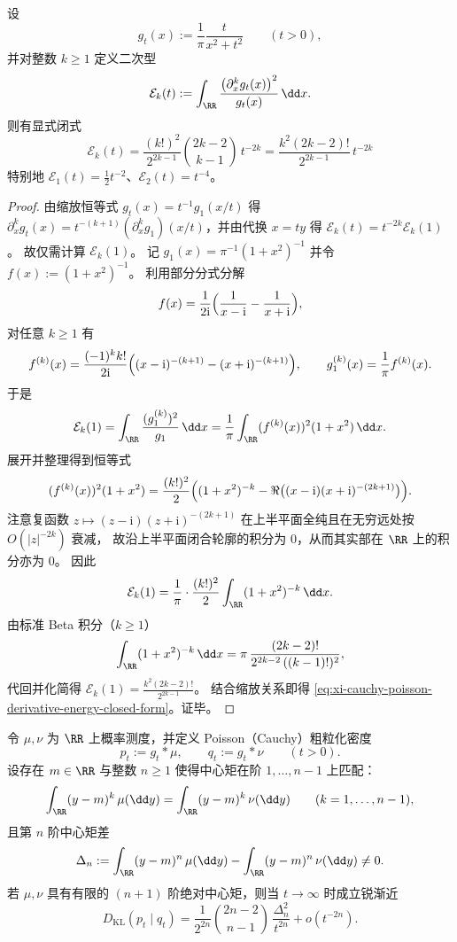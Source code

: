 \begin{proposition}\label{prop:xi-cauchy-poisson-derivative-energy-closed-form}
设
\[
g_t(x):=\frac{1}{\pi}\frac{t}{x^2+t^2}\qquad(t>0),
\]
并对整数 \(k\ge 1\) 定义二次型
\[
\mathcal{E}_k(t):=\int_{\RR}\frac{\bigl(\partial_x^{k}g_t(x)\bigr)^2}{g_t(x)}\,\dd x.
\]
则有显式闭式
\begin{equation}\label{eq:xi-cauchy-poisson-derivative-energy-closed-form}
\boxed{\;
\mathcal{E}_k(t)=\frac{(k!)^2}{2^{2k-1}}\binom{2k-2}{k-1}\,t^{-2k}
=\frac{k^2(2k-2)!}{2^{2k-1}}\,t^{-2k}\;}
\end{equation}
特别地 \(\mathcal{E}_1(t)=\tfrac12 t^{-2}\)、\(\mathcal{E}_2(t)=t^{-4}\)。
\end{proposition}

\begin{proof}
由缩放恒等式 \(g_t(x)=t^{-1}g_1(x/t)\) 得
\(
\partial_x^k g_t(x)=t^{-(k+1)}(\partial_x^k g_1)(x/t)
\)，并由代换 \(x=ty\) 得
\(
\mathcal{E}_k(t)=t^{-2k}\mathcal{E}_k(1)
\)。
故仅需计算 \(\mathcal{E}_k(1)\)。
记 \(g_1(x)=\pi^{-1}(1+x^2)^{-1}\) 并令 \(f(x):=(1+x^2)^{-1}\)。
利用部分分式分解
\[
f(x)=\frac{1}{2\mathrm{i}}\Bigl(\frac{1}{x-\mathrm{i}}-\frac{1}{x+\mathrm{i}}\Bigr),
\]
对任意 \(k\ge 1\) 有
\[
f^{(k)}(x)=\frac{(-1)^k k!}{2\mathrm{i}}\Bigl((x-\mathrm{i})^{-(k+1)}-(x+\mathrm{i})^{-(k+1)}\Bigr),
\qquad
g_1^{(k)}(x)=\frac{1}{\pi}f^{(k)}(x).
\]
于是
\[
\mathcal{E}_k(1)
=\int_{\RR}\frac{(g_1^{(k)})^2}{g_1}\,\dd x
=\frac{1}{\pi}\int_{\RR}(f^{(k)}(x))^2(1+x^2)\,\dd x.
\]
展开并整理得到恒等式
\[
(f^{(k)}(x))^2(1+x^2)
=\frac{(k!)^2}{2}\Bigl((1+x^2)^{-k}-\Re\bigl((x-\mathrm{i})(x+\mathrm{i})^{-(2k+1)}\bigr)\Bigr).
\]
注意复函数 \(z\mapsto (z-\mathrm{i})(z+\mathrm{i})^{-(2k+1)}\) 在上半平面全纯且在无穷远处按 \(O(|z|^{-2k})\) 衰减，
故沿上半平面闭合轮廓的积分为 \(0\)，从而其实部在 \(\RR\) 上的积分亦为 \(0\)。
因此
\[
\mathcal{E}_k(1)=\frac{1}{\pi}\cdot\frac{(k!)^2}{2}\int_{\RR}(1+x^2)^{-k}\,\dd x.
\]
由标准 Beta 积分（\(k\ge 1\)）
\[
\int_{\RR}(1+x^2)^{-k}\,\dd x
=\pi\,\frac{(2k-2)!}{2^{2k-2}\,((k-1)!)^2},
\]
代回并化简得
\(
\mathcal{E}_k(1)=\frac{k^2(2k-2)!}{2^{2k-1}}
\)。
结合缩放关系即得 \eqref{eq:xi-cauchy-poisson-derivative-energy-closed-form}。证毕。
\end{proof}

\begin{theorem}\label{thm:xi-poisson-coarsegraining-first-mismatch-kl}
令 \(\mu,\nu\) 为 \(\RR\) 上概率测度，并定义 Poisson（Cauchy）粗粒化密度
\[
p_t:=g_t*\mu,\qquad q_t:=g_t*\nu\qquad(t>0).
\]
设存在 \(m\in\RR\) 与整数 \(n\ge 1\) 使得中心矩在阶 \(1,\dots,n-1\) 上匹配：
\[
\int_{\RR}(y-m)^k\,\mu(\dd y)=\int_{\RR}(y-m)^k\,\nu(\dd y)\qquad(k=1,\dots,n-1),
\]
且第 \(n\) 阶中心矩差
\[
\Delta_n:=\int_{\RR}(y-m)^n\,\mu(\dd y)-\int_{\RR}(y-m)^n\,\nu(\dd y)\neq 0.
\]
若 \(\mu,\nu\) 具有有限的 \((n+1)\) 阶绝对中心矩，则当 \(t\to\infty\) 时成立锐渐近
\begin{equation}\label{eq:xi-poisson-first-mismatch-kl-leading}
\boxed{\;
D_{\mathrm{KL}}(p_t\mid q_t)
=\frac{1}{2^{2n}}\binom{2n-2}{n-1}\,\frac{\Delta_n^2}{t^{2n}}+o(t^{-2n}).\;}
\end{equation}
\end{theorem}


